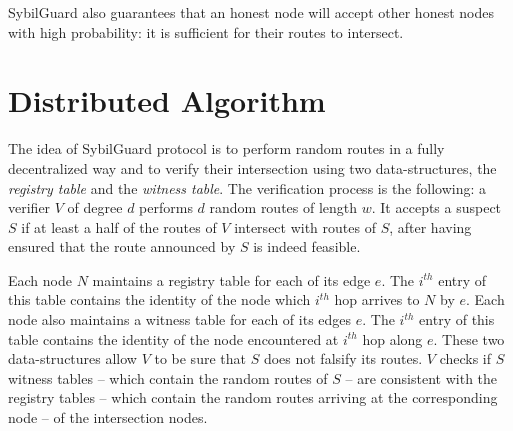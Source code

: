 \documentclass[a4paper,11pt]{article}
\begin{document}
SybilGuard also guarantees that an honest node will accept other honest
nodes with high probability: it is sufficient for their routes to
intersect.


\section{Distributed Algorithm}


The idea of SybilGuard protocol is to perform random routes in a fully
decentralized way and to verify their intersection using two
data-structures, the \emph{registry table} and the \emph{witness
table}. The verification process is the following: a verifier $V$ of
degree $d$ performs $d$ random routes of length $w$. It accepts a
suspect $S$ if at least a half of the routes of $V$ intersect with
routes of $S$, after having ensured that the route announced by $S$ is
indeed feasible.


Each node $N$ maintains a registry table for each of its edge $e$.  The
$i^{th}$ entry of this table contains the identity of the node which
$i^{th}$ hop arrives to $N$ by $e$.  Each node also maintains a witness
table for each of its edges $e$.  The $i^{th}$ entry of this table
contains the identity of the node encountered at $i^{th}$ hop along
$e$.  These two data-structures allow $V$ to be sure that $S$ does not
falsify its routes. $V$ checks if $S$ witness tables -- which contain
the random routes of $S$ -- are consistent with the registry tables --
which contain the random routes arriving at the corresponding node --
of the intersection nodes.
\end{document}
